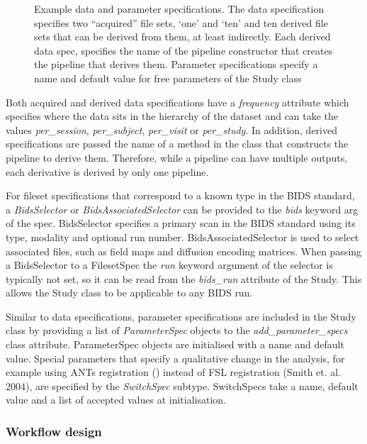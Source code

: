 \begin{figure}

\caption{Example data and parameter specifications. The data
specification specifies two ``acquired'' file sets, `one' and `ten' and
ten derived file sets that can be derived from them, at least
indirectly. Each derived data spec, specifies the name of the pipeline
constructor that creates the pipeline that derives them. Parameter
specifications specify a name and default value for free parameters of
the Study class}
\label{list:data_spec}
\end{figure}

Both acquired and derived data specifications have a \emph{frequency}
attribute which specifies where the data sits in the hierarchy of the
dataset and can take the values \emph{per\_session},
\emph{per\_subject}, \emph{per\_visit} or \emph{per\_study}. In
addition, derived specifications are passed the name of a method in the
class that constructs the pipeline to derive them. Therefore, while a
pipeline can have multiple outputs, each derivative is derived by only
one pipeline.

For fileset specifications that correspond to a known type in the BIDS
standard, a \emph{BidsSelector} or \emph{BidsAssociatedSelector} can be
provided to the \emph{bids} keyword arg of the spec. BidsSelector
specifies a primary scan in the BIDS standard using its type, modality
and optional run number. BidsAssociatedSelector is used to select
associated files, such as field maps and diffusion encoding matrices.
When passing a BidsSelector to a FilesetSpec the \emph{run} keyword
argument of the selector is typically not set, so it can be read from
the \emph{bids\_run} attribute of the Study. This allows the Study class
to be applicable to any BIDS run.

Similar to data specifications, parameter specifications are included in
the Study class by providing a list of \emph{ParameterSpec} objects to
the \emph{add\_parameter\_specs} class attribute. ParameterSpec objects
are initialised with a name and default value. Special parameters that
specify a qualitative change in the analysis, for example using ANTs
registration (\cite{avants_reproducible_2011}) instead of FSL registration (Smith et. al. 2004), are specified by the \emph{SwitchSpec} subtype.
SwitchSpecs take a name, default value and a list of accepted values at
initialisation.

\subsubsection{Workflow design}
\label{workflow-design}

